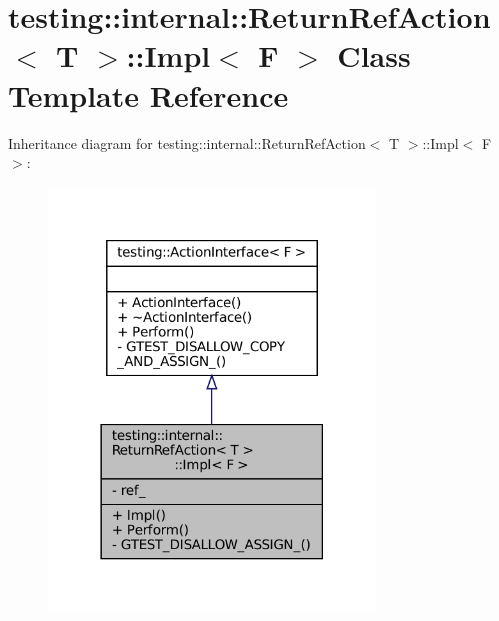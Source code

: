 \hypertarget{classtesting_1_1internal_1_1ReturnRefAction_1_1Impl}{}\section{testing\+:\+:internal\+:\+:Return\+Ref\+Action$<$ T $>$\+:\+:Impl$<$ F $>$ Class Template Reference}
\label{classtesting_1_1internal_1_1ReturnRefAction_1_1Impl}


Inheritance diagram for testing\+:\+:internal\+:\+:Return\+Ref\+Action$<$ T $>$\+:\+:Impl$<$ F $>$\+:
\nopagebreak
\begin{figure}[H]
\begin{center}
\leavevmode
\includegraphics[width=246pt]{classtesting_1_1internal_1_1ReturnRefAction_1_1Impl__inherit__graph}
\end{center}
\end{figure}


